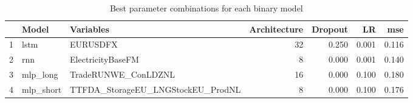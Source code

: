 \begin{table}[ht]
\centering
\begin{tabular}{rllrrrr}
  \hline
 & Model & Variables & Architecture & Dropout & LR & mse \\ 
  \hline
1 & lstm & EURUSDFX &   32 & 0.250 & 0.001 & 0.116 \\ 
  2 & rnn & ElectricityBaseFM &    8 & 0.000 & 0.001 & 0.140 \\ 
  3 & mlp\_long & TradeRUNWE\_ConLDZNL &   16 & 0.000 & 0.100 & 0.180 \\ 
  4 & mlp\_short & TTFDA\_StorageEU\_LNGStockEU\_ProdNL &    8 & 0.000 & 0.100 & 0.176 \\ 
   \hline
\end{tabular}
\caption{Best parameter combinations for each binary model} 
\label{tab:best_models}
\end{table}
